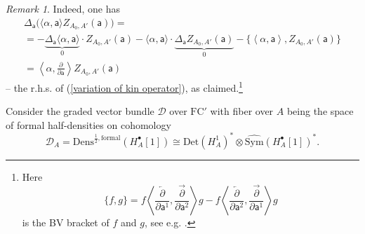 \documentclass[11pt,a4paper]{amsart}
\theoremstyle{plain} %
\newtheorem{thm}{Theorem}[section]
\theoremstyle{definition}
\theoremstyle{remark}
\newtheorem{rem}[thm]{Remark}
\newcommand{\g}{\mathfrak{g}}
\newcommand{\Sym}{\operatorname{Sym}}
\newcommand{\mr}{\mathrm}
\newcommand{\sfa}{\mathsf{a}}
\newcommand{\bt}{\bullet}
\newcommand{\wh}{\widehat}
\newcommand{\til}{\widetilde}
\newcommand{\mc}{\mathcal}
\newcommand{\FC}{\mathrm{FC}}
\begin{document}
{\begin{rem}
Indeed, one has
\begin{multline}
    \Delta_\sfa\Big(\langle \alpha, \sfa\rangle Z_{A_0,A'}(\sfa)\Big)=\\
    =
   -\underbrace{\Delta_\sfa \langle \alpha, \sfa\rangle}_0 \cdot Z_{A_0,A'}(\sfa)-
    \langle \alpha, \sfa\rangle \cdot \underbrace{\Delta_\sfa Z_{A_0,A'}(\sfa)}_0 -
    \Big\{\left\langle \alpha, \sfa\right\rangle, Z_{A_0,A'}(\sfa)\Big\}
    \\=
   \left \langle  \alpha, \frac{\partial}{\partial \sfa} \right\rangle Z_{A_0,A'}(\sfa)
\end{multline}
-- the r.h.s. of (\ref{variation of kin operator}), as claimed.\footnote{ Here $$\{f,g\} = f\left\langle \frac{\overleftarrow\partial }{\partial \sfa^{1}}, \frac{\overrightarrow\partial }{\partial \sfa^{2}}\right\rangle g - f\left\langle \frac{\overleftarrow\partial }{\partial \sfa^{2}}, \frac{\overrightarrow\partial }{\partial \sfa^{1}}\right\rangle g $$ is the BV bracket of $f$ and $g$, see e.g. \cite[Section 4.4.3]{mnev2019quantum}. } 
\end{rem}



Consider the graded vector bundle $\mc{D}$ over $\FC'$ with fiber over $A$ being the space of formal half-densities on cohomology
\begin{equation}\label{D factorization}
    \mc{D}_{A}=\mr{Dens}^{\frac12,\mr{formal}}(H^\bt_{A}[1])\cong
    \mr{Det} (H^1_{A})^* \otimes \widehat{\mr{Sym}}(H^\bt_{A}[1])^*.
\end{equation}

}
\end{document}
